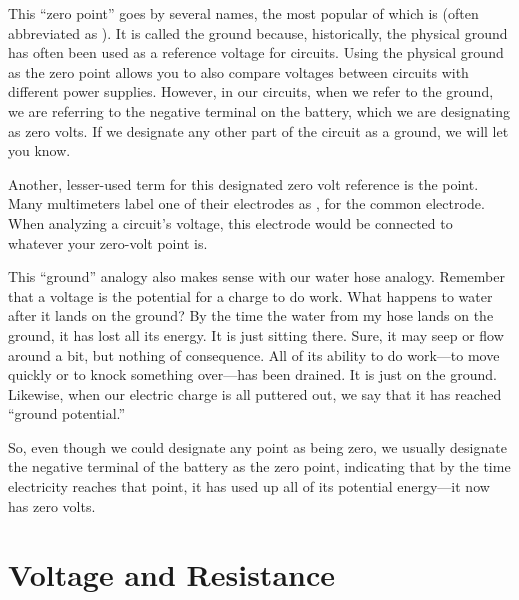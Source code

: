 This ``zero point'' goes by several names, the most popular of which is  (often abbreviated as ).
It is called the ground because, historically, the physical ground has often been used as a reference voltage for circuits.
Using the physical ground as the zero point allows you to also compare voltages between circuits with different power supplies.
However, in our circuits, when we refer to the ground, we are referring to the negative terminal on the battery, which we are designating as zero volts.
If we designate any other part of the circuit as a ground, we will let you know.  %

Another, lesser-used term for this designated zero volt reference is the  point.
Many multimeters label one of their electrodes as , for the common electrode.
When analyzing a circuit's voltage, this electrode would be connected to whatever your zero-volt point is.

This ``ground'' analogy also makes sense with our water hose analogy.
Remember that a voltage is the potential for a charge to do work.
What happens to water after it lands on the ground?
By the time the water from my hose lands on the ground, it has lost all its energy.
It is just sitting there.
Sure, it may seep or flow around a bit, but nothing of consequence.
All of its ability to do work---to move quickly or to knock something over---has been drained.
It is just on the ground.
Likewise, when our electric charge is all puttered out, we say that it has reached ``ground potential.''

So, even though we could designate any point as being zero, we usually designate the negative terminal of the battery as the zero point, indicating that by the time electricity reaches that point, it has used up all of its potential energy---it now has zero volts.

\section{Voltage and Resistance}


